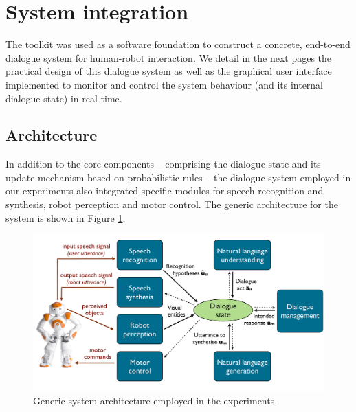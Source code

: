 
\section{System integration}
\label{sec:system-integration}
The \opendial{} toolkit was used as a software foundation to construct a concrete, end-to-end dialogue system for human-robot interaction.  We detail in the next pages the practical design of this dialogue system as well as the graphical user interface implemented to monitor and control the system behaviour (and its internal dialogue state) in real-time. 

\subsection{Architecture}

In addition to the \opendial{} core components -- comprising the dialogue state and its update mechanism based on probabilistic rules -- the dialogue system employed in our experiments also integrated specific modules for speech recognition and synthesis, robot perception and motor control.  The generic architecture for the system is shown in Figure \ref{fig:impl_architecture}. 

\begin{figure}[h]
\centering
\includegraphics[scale=0.30]{imgs/impl_architecture.pdf}
\caption{Generic system architecture employed in the experiments.}
\label{fig:impl_architecture}
\end{figure}


